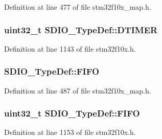 Definition at line 477 of file stm32f10x\+\_\+map.\+h.

\subsubsection[{\texorpdfstring{D\+T\+I\+M\+ER}{DTIMER}}]{ {\bf uint32\+\_\+t} S\+D\+I\+O\+\_\+\+Type\+Def\+::\+D\+T\+I\+M\+ER}\hypertarget{struct_s_d_i_o___type_def_a5af1984c7c00890598ca74fc85449f9f}{}\label{struct_s_d_i_o___type_def_a5af1984c7c00890598ca74fc85449f9f}


Definition at line 1143 of file stm32f10x.\+h.

\subsubsection[{\texorpdfstring{F\+I\+FO}{FIFO}}]{ S\+D\+I\+O\+\_\+\+Type\+Def\+::\+F\+I\+FO}\hypertarget{struct_s_d_i_o___type_def_a08ba73b2a86cda5dbfa32d8cc79ae239}{}\label{struct_s_d_i_o___type_def_a08ba73b2a86cda5dbfa32d8cc79ae239}


Definition at line 487 of file stm32f10x\+\_\+map.\+h.

\subsubsection[{\texorpdfstring{F\+I\+FO}{FIFO}}]{ {\bf uint32\+\_\+t} S\+D\+I\+O\+\_\+\+Type\+Def\+::\+F\+I\+FO}\hypertarget{struct_s_d_i_o___type_def_ab4757027388ea3a0a6f114d7de2ed4cf}{}\label{struct_s_d_i_o___type_def_ab4757027388ea3a0a6f114d7de2ed4cf}


Definition at line 1153 of file stm32f10x.\+h.


